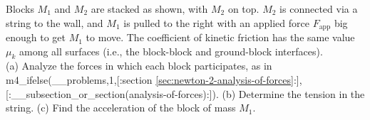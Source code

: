 Blocks $M_1$ and $M_2$ are stacked as shown, with $M_2$ on top. $M_2$
is connected via a string to the wall, and $M_1$ is pulled to the
right with an applied force $F_\text{app}$ big enough to get $M_1$ to
move. The coefficient of kinetic friction has the same value $\mu_k$ among all surfaces
(i.e., the block-block and ground-block interfaces).\\
%
(a) Analyze the forces in which each block participates, as in
m4_ifelse(__problems,1,[:section \ref{sec:newton-2-analysis-of-forces}:],[:__subsection_or_section(analysis-of-forces):]).\hwendpart
%
(b) Determine the tension in the string.\hwendpart
%
(c) Find the acceleration of the block of mass $M_1$.
